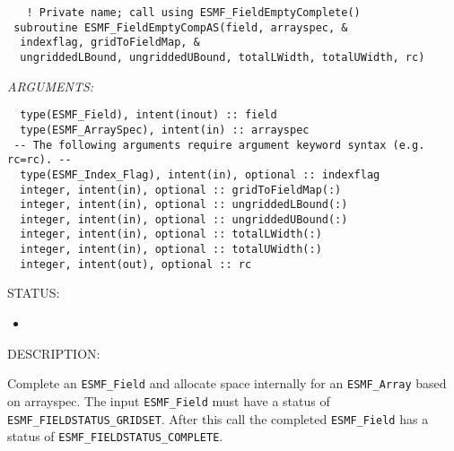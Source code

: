 \begin{verbatim}   ! Private name; call using ESMF_FieldEmptyComplete()
 subroutine ESMF_FieldEmptyCompAS(field, arrayspec, &
  indexflag, gridToFieldMap, &
  ungriddedLBound, ungriddedUBound, totalLWidth, totalUWidth, rc)\end{verbatim}{\em ARGUMENTS:}
\begin{verbatim}  type(ESMF_Field), intent(inout) :: field
  type(ESMF_ArraySpec), intent(in) :: arrayspec
 -- The following arguments require argument keyword syntax (e.g. rc=rc). --
  type(ESMF_Index_Flag), intent(in), optional :: indexflag
  integer, intent(in), optional :: gridToFieldMap(:)
  integer, intent(in), optional :: ungriddedLBound(:)
  integer, intent(in), optional :: ungriddedUBound(:)
  integer, intent(in), optional :: totalLWidth(:)
  integer, intent(in), optional :: totalUWidth(:)
  integer, intent(out), optional :: rc\end{verbatim}
{\sf STATUS:}
   \begin{itemize}
   \item{}
   \end{itemize}
  
{\sf DESCRIPTION:\\ }


   Complete an {\tt ESMF\_Field} and allocate space internally for an
   {\tt ESMF\_Array} based on arrayspec.
   The input {\tt ESMF\_Field} must have a status of
   {\tt ESMF\_FIELDSTATUS\_GRIDSET}. After this call the completed {\tt ESMF\_Field}
   has a status of {\tt ESMF\_FIELDSTATUS\_COMPLETE}.
  
